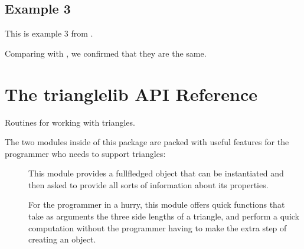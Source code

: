 \documentclass[letterpaper,10pt,english]{sphinxmanual}
\begin{document}
\section{Example 3}
\label{\detokenize{examples:example-3}}
This is example 3  from .

%
\begin{sphinxVerbatim}[commandchars=\\\{\}]
   

   

        
     
     
\end{sphinxVerbatim}
\sphinxresetverbatimhllines

Comparing with {\hyperref[\detokenize{examples:reference-2}]{}}, we confirmed that they are the same.


\chapter{The trianglelib API Reference}
\label{\detokenize{api:module-trianglelib}}\label{\detokenize{api:the-trianglelib-api-reference}}\label{\detokenize{api::doc}}
Routines for working with triangles.

The two modules inside of this package are packed with useful features
for the programmer who needs to support triangles:
\begin{description}
\item[{}] \leavevmode
This module provides a full\sphinxhyphen{}fledged  object that can be
instantiated and then asked to provide all sorts of information
about its properties.

\item[{}] \leavevmode
For the programmer in a hurry, this module offers quick functions
that take as arguments the three side lengths of a triangle, and
perform a quick computation without the programmer having to make
the extra step of creating an object.

\end{description}
\end{document}

